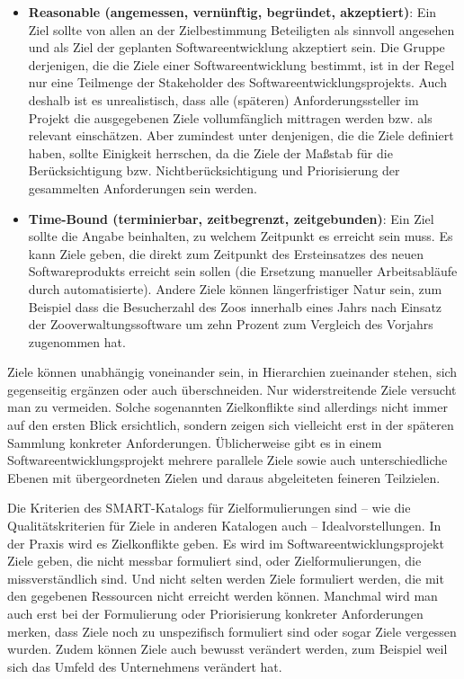 \begin{itemize}
	\vspace{2.3mm} %

	\item \textbf{Reasonable (angemessen, vernünftig, begründet, akzeptiert)}: Ein Ziel sollte von allen an der Zielbestimmung Beteiligten als sinnvoll angesehen und als Ziel der geplanten Softwareentwicklung akzeptiert sein. Die Gruppe der\-jenigen, die die Ziele einer Softwareentwicklung bestimmt, ist in der Regel nur eine Teilmenge der Stakeholder des Softwareentwicklungsprojekts. Auch deshalb ist es unrealistisch, dass alle (späteren) Anforderungssteller im Projekt die ausgegebenen Ziele vollumfänglich mittragen werden bzw. als relevant einschätzen. Aber zumindest unter denjenigen, die die Ziele definiert haben, sollte Einigkeit herrschen, da die Ziele der Maßstab für die Berücksichtigung bzw. Nichtberücksichtigung und Priorisierung der gesammelten Anforderungen sein werden.
	
	\vspace{2.3mm} %

	\item \textbf{Time-Bound (terminierbar, zeitbegrenzt, zeitgebunden)}: Ein Ziel sollte die Angabe beinhalten, zu welchem Zeitpunkt es erreicht sein muss. Es kann Ziele geben, die direkt zum Zeitpunkt des Ersteinsatzes des neuen Software\-produkts erreicht sein sollen (\zb die Ersetzung manueller Arbeitsabläufe durch automatisierte). Andere Ziele können längerfristiger Natur sein, zum Beispiel dass die Besucherzahl des Zoos innerhalb eines Jahrs nach Einsatz der Zooverwaltungssoftware um zehn Prozent zum Vergleich des Vorjahrs zugenommen hat.
\end{itemize}

Ziele  können unabhängig voneinander sein, in Hierarchien zueinander stehen, sich gegenseitig ergänzen oder auch überschneiden. Nur widerstreitende Ziele versucht man zu vermeiden. Solche sogenannten Zielkonflikte sind allerdings nicht immer auf den ersten Blick ersichtlich, sondern zeigen sich vielleicht erst in der späteren Sammlung konkreter Anforderungen. Üblicherweise gibt es in einem Software\-entwicklungs\-projekt mehrere parallele Ziele sowie auch unterschiedliche Ebenen mit übergeordneten Zielen und daraus abgeleiteten feineren Teilzielen.

Die Kriterien des SMART-Katalogs für Zielformulierungen sind -- wie die Qualitäts\-kriterien für Ziele in anderen Katalogen auch -- Idealvorstellungen. In der Praxis wird es Zielkonflikte geben. Es wird im Softwareentwicklungsprojekt Ziele geben, die nicht messbar formuliert sind, oder Zielformulierungen, die missverständlich sind. Und nicht selten werden Ziele formuliert werden, die mit den gegebenen Ressourcen nicht erreicht werden können. Manchmal wird man auch erst bei der Formulierung oder Priorisierung konkreter Anforderungen merken, dass Ziele noch zu unspezifisch formuliert sind oder sogar Ziele vergessen wurden. Zudem können Ziele auch bewusst verändert werden, zum Beispiel weil sich das Umfeld des Unternehmens verändert hat. 

